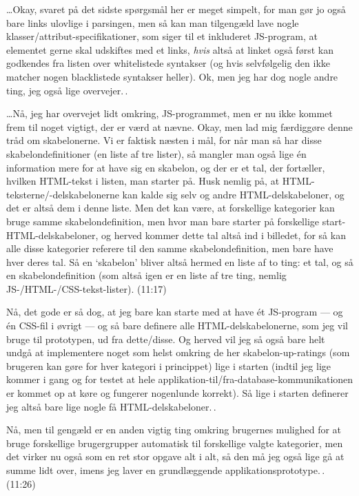 \documentclass{report}
\begin{document}
\ldots Okay, svaret på det sidste spørgsmål her er meget simpelt, for man gør jo også bare links ulovlige i parsingen, men så kan man tilgengæld lave nogle klasser/attribut-specifikationer, som siger til et inkluderet JS-program, at elementet gerne skal udskiftes med et links, \emph{hvis} altså at linket også først kan godkendes fra listen over whitelistede syntakser (og hvis selvfølgelig den ikke matcher nogen blacklistede syntakser heller). Ok, men jeg har dog nogle andre ting, jeg også lige overvejer.\,. 

\ldots Nå, jeg har overvejet lidt omkring, JS-programmet, men er nu ikke kommet frem til noget vigtigt, der er værd at nævne. Okay, men lad mig færdiggøre denne tråd om skabelonerne. Vi er faktisk næsten i mål, for når man så har disse skabelondefinitioner (en liste af tre lister), så mangler man også lige én information mere for at have sig en skabelon, og der er et tal, der fortæller, hvilken HTML-tekst i listen, man starter på. Husk nemlig på, at HTML-teksterne/-delskabelonerne kan kalde sig selv og andre HTML-delskabeloner, og det er altså dem i denne liste. Men det kan være, at forskellige kategorier kan bruge samme skabelondefinition, men hvor man bare starter på forskellige start-HTML-delskabeloner, og herved kommer dette tal altså ind i billedet, for så kan alle disse kategorier referere til den samme skabelondefinition, men bare have hver deres tal. Så en `skabelon' bliver altså hermed en liste af to ting: et tal, og så en skabelondefinition (som altså igen er en liste af tre ting, nemlig JS-/HTML-/CSS-tekst-lister). (11:17)

Nå, det gode er så dog, at jeg bare kan starte med at have ét JS-program --- og én CSS-fil i øvrigt --- og så bare definere alle HTML-delskabelonerne, som jeg vil bruge til prototypen, ud fra dette/disse. Og herved vil jeg så også bare helt undgå at implementere noget som helst omkring de her skabelon-up-ratings (som brugeren kan gøre for hver kategori i princippet) lige i starten (indtil jeg lige kommer i gang og for testet at hele applikation-til/fra-database-kommunikationen er kommet op at køre og fungerer nogenlunde korrekt). Så lige i starten definerer jeg altså bare lige nogle få HTML-delskabeloner.\,.

Nå, men til gengæld er en anden vigtig ting omkring brugernes mulighed for at bruge forskellige brugergrupper automatisk til forskellige valgte kategorier, men det virker nu også som en ret stor opgave alt i alt, så den må jeg også lige gå at summe lidt over, imens jeg laver en grundlæggende applikationsprototype.\,. (11:26)
\end{document}

